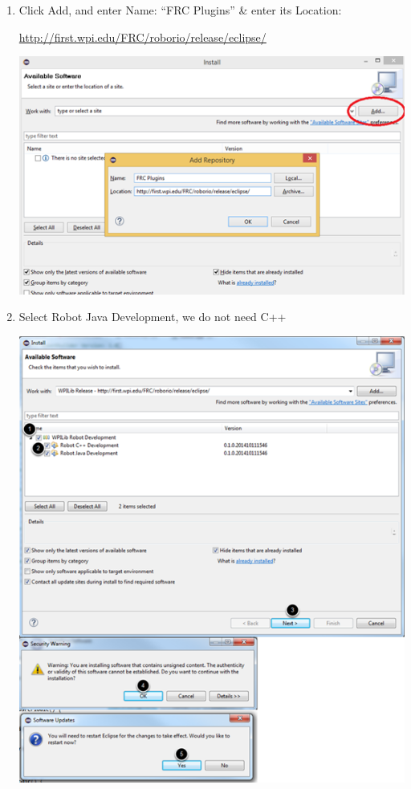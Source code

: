 \documentclass{article}
\begin{document}
\begin{enumerate}
        \item Click Add, and enter Name: “FRC Plugins” \& enter its Location:
        
        \url{http://first.wpi.edu/FRC/roborio/release/eclipse/}

        \includegraphics[scale=.95]{2i.png}
        
        \item Select Robot Java Development, we do not need C++
        
        \includegraphics[scale=.97]{2j.png}
        

\end{enumerate}
\end{document}
